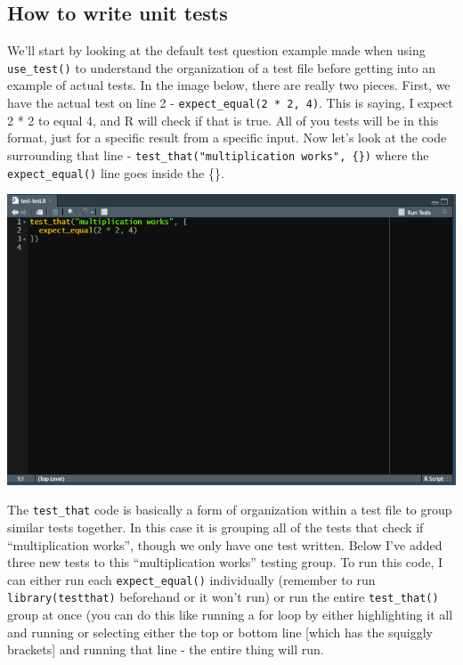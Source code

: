 \documentclass[
]{krantz}
\begin{document}
\hypertarget{how-to-write-unit-tests}{%
\subsection{How to write unit tests}\label{how-to-write-unit-tests}}

We'll start by looking at the default test question example made when using \texttt{use\_test()} to understand the organization of a test file before getting into an example of actual tests. In the image below, there are really two pieces. First, we have the actual test on line 2 - \texttt{expect\_equal(2\ *\ 2,\ 4)}. This is saying, I expect 2 * 2 to equal 4, and R will check if that is true. All of you tests will be in this format, just for a specific result from a specific input. Now let's look at the code surrounding that line - \texttt{test\_that("multiplication\ works",\ \{\})} where the \texttt{expect\_equal()} line goes inside the \{\}.

\includegraphics{images/usethis_test_default_example.PNG}

The \texttt{test\_that} code is basically a form of organization within a test file to group similar tests together. In this case it is grouping all of the tests that check if ``multiplication works'', though we only have one test written. Below I've added three new tests to this ``multiplication works'' testing group. To run this code, I can either run each \texttt{expect\_equal()} individually (remember to run \texttt{library(testthat)} beforehand or it won't run) or run the entire \texttt{test\_that()} group at once (you can do this like running a for loop by either highlighting it all and running or selecting either the top or bottom line {[}which has the squiggly brackets{]} and running that line - the entire thing will run.
\end{document}
